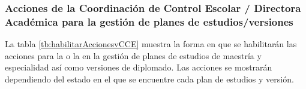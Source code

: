 
\subsubsection{Acciones de la Coordinación de Control Escolar / Directora Académica para la gestión de planes de estudios/versiones}
La tabla \ref{tb:habilitarAccionesvCCE}  muestra la forma en que se habilitarán las acciones para la  o la  en la gestión de planes de estudios de maestría y especialidad así como versiones de diplomado. Las acciones se mostrarán dependiendo del estado en el que se encuentre cada plan de estudios y versión.\\

